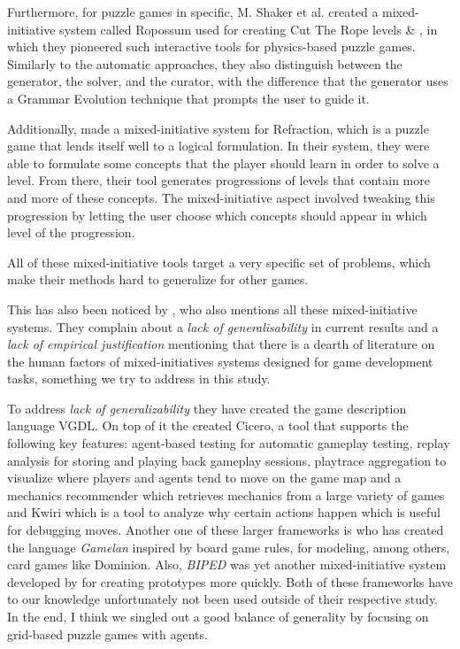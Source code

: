 Furthermore, for puzzle games in specific, M. Shaker et al. created a mixed-initiative system called Ropossum used for creating Cut The Rope levels \cite{Shaker2013} \& \cite{Shaker2013Ropossum}, in which they pioneered such interactive tools for physics-based puzzle games. Similarly to the automatic approaches, they also distinguish between the generator, the solver, and the curator, with the difference that the generator uses a Grammar Evolution technique that prompts the user to guide it.

Additionally, \cite{Butler2013} made a mixed-initiative system for Refraction, which is a puzzle game that lends itself well to a logical formulation. In their system, they were able to formulate some concepts that the player should learn in order to solve a level. From there, their tool generates progressions of levels that contain more and more of these concepts. The mixed-initiative aspect involved tweaking this progression by letting the user choose which concepts should appear in which level of the progression.

All of these mixed-initiative tools target a very specific set of problems, which make their methods hard to generalize for other games.

This has also been noticed by \cite{MacHado2018}, who also mentions all these mixed-initiative systems. They complain about a \textit{lack of generalisability} in current results and a \textit{lack of empirical justification} mentioning that there is a dearth of literature on the human factors of mixed-initiatives systems designed for game development tasks, something we try to address in this study.

To address \textit{lack of generalizability} they have created the game description language VGDL. 
On top of it the created Cicero, a tool that supports the following key features: agent-based testing for automatic gameplay testing, replay analysis for storing and playing back gameplay sessions, playtrace aggregation to visualize where players and agents tend to move on the game map and a mechanics recommender which retrieves mechanics from a large variety of games and Kwiri which is a tool to analyze why certain actions happen which is useful for debugging moves. 
Another one of these larger frameworks is \cite{Osborn2011} who has created the language \textit{Gamelan} inspired by board game rules, for modeling, among others, card games like Dominion. Also, \textit{BIPED} was yet another mixed-initiative system developed by \cite{Smith2008} for creating prototypes more quickly. Both of these frameworks have to our knowledge unfortunately not been used outside of their respective study.
In the end, I think we singled out a good balance of generality by focusing on grid-based puzzle games with agents.

